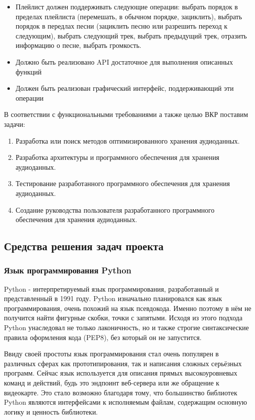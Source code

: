 \documentclass[14pt]{extarticle}
\begin{document}
\begin{itemize}
\begin{itemize}
		\item Плейлист должен поддерживать следующие операции: выбрать порядок в пределах плейлиста (перемешать, в обычном порядке, зациклить), выбрать порядок в передлах песни (зациклить песню или разрешить переход к следующим), выбрать следующий трек, выбрать предыдущий трек, отразить информацию о песне, выбрать громкость.
		\item Должно быть реализовано API достаточное для выполнения описанных функций
		\item Должен быть реализован графический интерфейс, поддерживающий эти операции
	\end{itemize}
	
\end{itemize}

В соответствии с функциональными требованиями а также целью ВКР поставим задачи:

\begin{enumerate}[label=\arabic*., wide]
	\item Разработка или поиск методов оптимизированного хранения аудиоданных.
	\item Разработка архитектуры и программного обеспечения для хранения аудиоданных.
	\item Тестирование разработанного программного обеспечения для хранения аудиоданных.	
	\item Создание руководства пользователя разработанного программного обеспечения для хранения аудиоданных.
\end{enumerate}

\subsection{Средства решения задач проекта}

\subsubsection{Язык программирования Python}

Python - интерпретируемый язык программирования, разработанный и представленный в 1991 году. 
Python изначально планировался как язык программирования, очень похожий на язык псевдокода. Именно
поэтому в нём не получится найти фигурные скобки, точки с запятыми. 
Исходя из этого подхода Python унаследовал не только лаконичность, но и также строгие
синтаксические правила оформления кода (PEP8), без который он не запустится.

Ввиду своей простоты язык программирования стал очень популярен в различных сферах как прототипирования, 
так и написания сложных серьёзных программ. Сейчас язык используется для описания прямых высокоуровневых
команд и действий, будь это эндпоинт веб-сервера или же обращение к видеокарте. Это стало возможно
благодаря тому, что большинство библиотек Python являются интерфейсами к исполняемым файлам, содержащим
основную логику и ценность библиотеки. 
\end{document}
